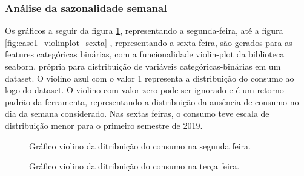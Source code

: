 \documentclass[	12pt, Times, openright, twoside, a4paper, english, brazil]{abntex2}
\begin{document}
    	    \subsubsection{Análise da sazonalidade semanal}
    	        Os gráficos a seguir da figura  \ref{fig:case1_violinplot_segunda}, representando a segunda-feira,  até a figura \ref{fig:case1_violinplot_sexta} , representando a sexta-feira,  são gerados para as features categóricas binárias, com a funcionalidade violin-plot da biblioteca seaborn, própria para distribuição de variáveis categóricas-binárias em um dataset.
    	        O violino azul com o valor 1 representa a distribuição do consumo ao logo do dataset.
    	        O violino com valor zero pode ser ignorado e é um retorno padrão da ferramenta, representando a distribuição da ausência de consumo no dia da semana considerado.
    	        Nas sextas feiras, o consumo teve escala de distribuição menor para o primeiro semestre de 2019.
    	         \begin{figure}[!ht]
                	\caption{Gráfico violino da ditribuição do consumo na segunda feira. \label{fig:case1_violinplot_segunda} }
                \end{figure}
                
                \begin{figure}[!ht]
                	\caption{Gráfico violino da ditribuição do consumo na terça feira. \label{fig:case1_violinplot_terca} }
                \end{figure}
                
\end{document}
